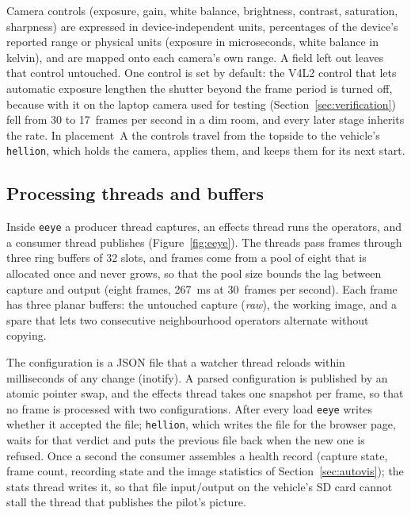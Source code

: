 \documentclass[a4paper,fleqn]{cas-sc}
\newcommand{\eeye}{\texttt{eeye}}
\newcommand{\hellion}{\texttt{hellion}}
\begin{document}
Camera controls (exposure, gain, white balance, brightness, contrast, saturation,
sharpness) are expressed in device-independent units, percentages of the device's
reported range or physical units (exposure in microseconds, white balance in kelvin),
and are mapped onto each camera's own range. A field left out leaves that control
untouched. One control is set by default: the V4L2 control that lets automatic
exposure lengthen the shutter beyond the frame period is turned off, because with it
on the laptop camera used for testing (Section~\ref{sec:verification}) fell from 30 to
17~frames per second in a dim room, and every later stage inherits the rate. In
placement~A the controls travel from the topside to the vehicle's \hellion{}, which
holds the camera, applies them, and keeps them for its next start.

\subsection{Processing threads and buffers}\label{sec:threads}

Inside \eeye{} a producer thread captures, an effects thread runs the operators, and
a consumer thread publishes (Figure~\ref{fig:eeye}). The threads pass frames through
three ring buffers of 32 slots, and frames come from a pool of eight that is allocated
once and never grows, so that the pool size bounds the lag between capture and output
(eight frames, 267~ms at 30~frames per second). Each frame has three planar buffers:
the untouched capture (\emph{raw}), the working image, and a spare that lets two
consecutive neighbourhood operators alternate without copying.

The configuration is a JSON file that a watcher thread reloads within milliseconds of
any change (inotify). A parsed configuration is published by an atomic pointer swap,
and the effects thread takes one snapshot per frame, so that no frame is processed
with two configurations. After every load \eeye{} writes whether it accepted the file;
\hellion{}, which writes the file for the browser page, waits for that verdict and
puts the previous file back when the new one is refused. Once a second the consumer
assembles a health record (capture state, frame count, recording state and the image
statistics of Section~\ref{sec:autovis}); the stats thread writes it, so that file
input/output on the vehicle's SD card cannot stall the thread that publishes the
pilot's picture.
\end{document}
